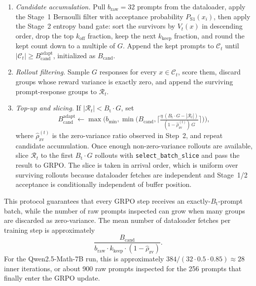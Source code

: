 \begin{enumerate}\itemsep=2pt\parsep=0pt\topsep=2pt
\item \textit{Candidate accumulation.} Pull $b_{\mathrm{raw}}{=}32$ prompts from the dataloader, apply the Stage~1 Bernoulli filter with acceptance probability $P_{\mathrm{S1}}(x_i)$, then apply the Stage~2 entropy band gate: sort the survivors by $V_t(x)$ in descending order, drop the top $k_{\mathrm{off}}$ fraction, keep the next $k_{\mathrm{keep}}$ fraction, and round the kept count down to a multiple of $G$. Append the kept prompts to $\mathcal{C}_t$ until $|\mathcal{C}_t|\geq B_{\mathrm{cand}}^{\mathrm{adapt}}$, initialized as $B_{\mathrm{cand}}$.
\item \textit{Rollout filtering.} Sample $G$ responses for every $x\in\mathcal{C}_t$, score them, discard groups whose reward variance is exactly zero, and append the surviving prompt-response groups to $\mathcal{R}_t$.
\item \textit{Top-up and slicing.} If $|\mathcal{R}_t|<B_{\mathrm{t}}\cdot G$, set
\[
B_{\mathrm{cand}}^{\mathrm{adapt}}
\gets
\max\!\Big(
b_{\mathrm{min}},
\min\!\big(
B_{\mathrm{cand}},
\big\lceil
\tfrac{\eta\,(B_{\mathrm{t}}\cdot G-|\mathcal{R}_t|)}
{(1-\hat\rho_{\mathrm{zv}}^{(t)})\,G}
\big\rceil
\big)
\Big),
\]
where $\hat\rho_{\mathrm{zv}}^{(t)}$ is the zero-variance ratio observed in Step~2, and repeat candidate accumulation. Once enough non-zero-variance rollouts are available, slice $\mathcal{R}_t$ to the first $B_{\mathrm{t}}\cdot G$ rollouts with \texttt{select\_batch\_slice} and pass the result to GRPO. The slice is taken in arrival order, which is uniform over surviving rollouts because dataloader fetches are independent and Stage~1/2 acceptance is conditionally independent of buffer position.
\end{enumerate}

This protocol guarantees that every GRPO step receives an exactly-$B_{\mathrm{t}}$-prompt batch, while the number of raw prompts inspected can grow when many groups are discarded as zero-variance. The mean number of dataloader fetches per training step is approximately
\[
\frac{B_{\mathrm{cand}}}
{b_{\mathrm{raw}}\cdot k_{\mathrm{keep}}\cdot(1-\hat\rho_{\mathrm{zv}})}.
\]
For the Qwen2.5-Math-7B run, this is approximately $384/(32\cdot0.5\cdot0.85)\approx28$ inner iterations, or about 900 raw prompts inspected for the 256 prompts that finally enter the GRPO update.
